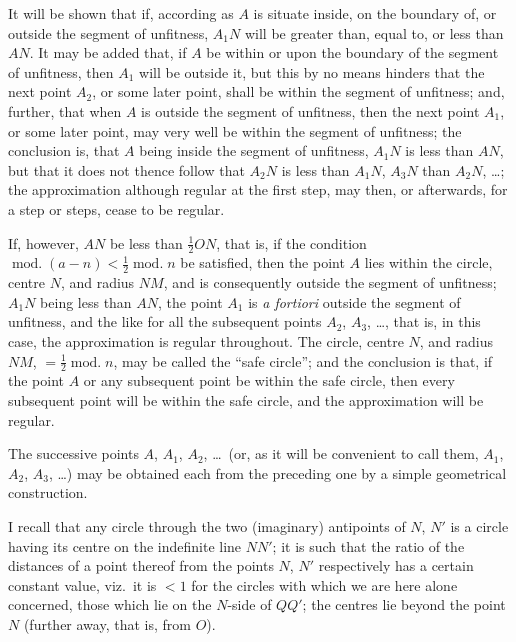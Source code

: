 \documentclass[12pt,a4paper]{article}
\theoremstyle{plain}
\begin{document}
It will be shown that if, according as $A$ is situate inside, on the
boundary of, or outside the segment of unfitness, $A_1N$ will be greater
than, equal to, or less than $AN$. It may be added that, if $A$ be within
or upon the boundary of the segment of unfitness, then $A_1$ will be outside
it, but this by no means hinders that the next point $A_2$, or some later
point, shall be within the segment of unfitness; and, further, that when
$A$ is outside the segment of unfitness, then the next point $A_1$, or some
later point, may very well be within the segment of unfitness; the
conclusion is, that $A$ being inside the segment of unfitness, $A_1N$ is less
than $AN$, but that it does not thence follow that $A_2N$ is less than $A_1N$,
$A_3N$ than $A_2N$, \dots; the approximation although regular at the first
step, may then, or afterwards, for a step or steps, cease to be regular.

If, however, $AN$ be less than $\frac{1}{2}ON$, that is, if the condition
$\operatorname{mod.}(a-n)<\frac{1}{2}\operatorname{mod.}n$ be satisfied, then the point $A$ lies
within the circle, centre $N$, and radius $NM$, and is consequently outside
the segment of unfitness; $A_1N$ being less than $AN$, the point $A_1$ is
\textit{a fortiori} outside the segment of unfitness, and the like for all the
subsequent points $A_2$, $A_3$, \dots, that is, in this case, the approximation
is regular throughout. The circle, centre $N$, and radius $NM$, $=\frac{1}{2}\operatorname{mod.}n$,
may be called the ``safe circle''; and the conclusion is that, if the point
$A$ or any subsequent point be within the safe circle, then every subsequent
point will be within the safe circle, and the approximation will be regular.

The successive points $A$, $A_1$, $A_2$, \dots\ (or, as it will be convenient to
call them, $A_1$, $A_2$, $A_3$, \dots) may be obtained each from the preceding
one by a simple geometrical construction.

I recall that any circle through the two (imaginary) antipoints of
$N$, $N'$ is a circle having its centre on the indefinite line $NN'$; it is such
that the ratio of the distances of a point thereof from the points $N$, $N'$
respectively has a certain constant value, viz.~it is $<1$ for the circles
with which we are here alone concerned, those which lie on the $N$-side
of $QQ'$; the centres lie beyond the point $N$ (further away, that is, from
$O$).
\end{document}
